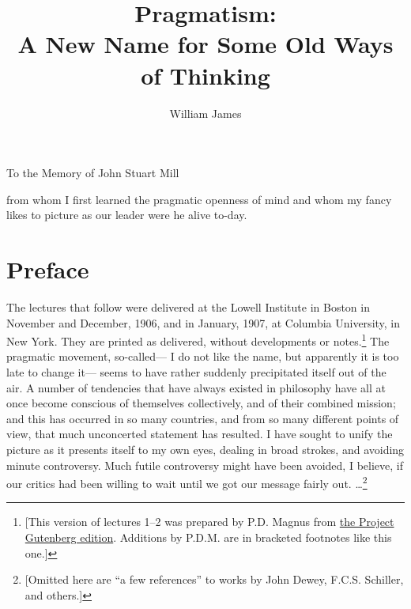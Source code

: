 \documentclass[]{article}
\begin{document}

\title{Pragmatism:\\ A New Name for Some Old Ways of Thinking}
\author{William James}
\date{}
\maketitle


\begin{center}
To the Memory of John Stuart Mill

from whom I first learned the pragmatic openness of mind and whom my
fancy likes to picture as our leader were he alive to-day.
\end{center}



\section*{Preface}

The lectures that follow were delivered at the Lowell Institute in
Boston in November and December, 1906, and in January, 1907, at
Columbia University, in New York. They are printed as delivered, without
developments or notes.\footnote{[This version of lectures 1--2 was prepared by P.D. Magnus from \href{http://www.gutenberg.org/ebooks/5116}{the Project Gutenberg edition}. Additions by P.D.M. are in bracketed footnotes like this one.]} The pragmatic movement, so-called--- I do not like
the name, but apparently it is too late to change it--- seems to have
rather suddenly precipitated itself out of the air. A number of
tendencies that have always existed in philosophy have all at once
become conscious of themselves collectively, and of their combined
mission; and this has occurred in so many countries, and from so many
different points of view, that much unconcerted statement has resulted.
I have sought to unify the picture as it presents itself to my own eyes,
dealing in broad strokes, and avoiding minute controversy. Much futile
controversy might have been avoided, I believe, if our critics had been
willing to wait until we got our message fairly out.
\ldots\footnote{[Omitted here are ``a few references'' to works by John Dewey, F.C.S. Schiller, and others.]}

\medskip
\end{document}
